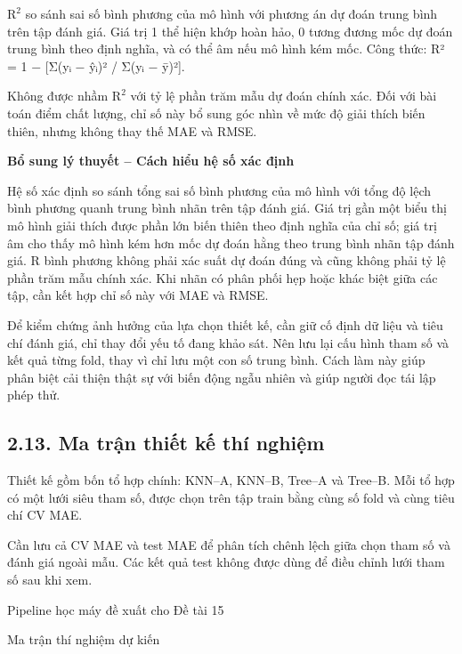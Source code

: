 \documentclass[12pt,a4paper,oneside]{article}
\begin{document}
\(\text{R}^{\text{2}}\) so sánh sai số bình phương của mô hình với
phương án dự đoán trung bình trên tập đánh giá. Giá trị 1 thể hiện khớp
hoàn hảo, 0 tương đương mốc dự đoán trung bình theo định nghĩa, và có
thể âm nếu mô hình kém mốc. Công thức: R² = 1 − {[}Σ(yᵢ − ŷᵢ)² / Σ(yᵢ −
ȳ)²{]}.

Không được nhầm \(\text{R}^{\text{2}}\) với tỷ lệ phần trăm mẫu dự đoán
chính xác. Đối với bài toán điểm chất lượng, chỉ số này bổ sung góc nhìn
về mức độ giải thích biến thiên, nhưng không thay thế MAE và RMSE.


\par\noindent\textbf{Bổ sung lý thuyết -- Cách hiểu hệ số xác định}\par
Hệ số xác định so sánh tổng sai số bình phương của mô hình với tổng độ lệch bình phương quanh trung bình nhãn trên tập đánh giá. Giá trị gần một biểu thị mô hình giải thích được phần lớn biến thiên theo định nghĩa của chỉ số; giá trị âm cho thấy mô hình kém hơn mốc dự đoán hằng theo trung bình nhãn tập đánh giá. R bình phương không phải xác suất dự đoán đúng và cũng không phải tỷ lệ phần trăm mẫu chính xác. Khi nhãn có phân phối hẹp hoặc khác biệt giữa các tập, cần kết hợp chỉ số này với MAE và RMSE.\par

Để kiểm chứng ảnh hưởng của lựa chọn thiết kế, cần giữ cố định dữ liệu và tiêu chí đánh giá, chỉ thay đổi yếu tố đang khảo sát. Nên lưu lại cấu hình tham số và kết quả từng fold, thay vì chỉ lưu một con số trung bình. Cách làm này giúp phân biệt cải thiện thật sự với biến động ngẫu nhiên và giúp người đọc tái lập phép thử.\par

\subsection*{2.13. Ma trận thiết kế thí nghiệm}

Thiết kế gồm bốn tổ hợp chính: KNN--A, KNN--B, Tree--A và Tree--B. Mỗi
tổ hợp có một lưới siêu tham số, được chọn trên tập train bằng cùng số
fold và cùng tiêu chí CV MAE.

Cần lưu cả CV MAE và test MAE để phân tích chênh lệch giữa chọn tham số
và đánh giá ngoài mẫu. Các kết quả test không được dùng để điều chỉnh
lưới tham số sau khi xem.

Pipeline học máy đề xuất cho Đề tài 15

Ma trận thí nghiệm dự kiến
\end{document}
